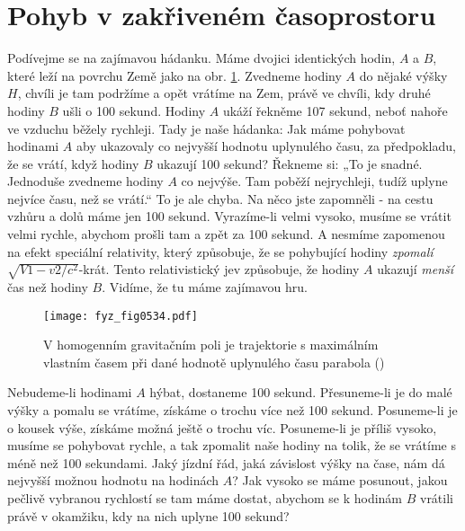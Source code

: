   \section{Pohyb v zakřiveném časoprostoru}\label{fyz:IIchapXVLIIsecVIII}
    Podívejme se na zajímavou hádanku. Máme dvojici identických hodin, \(A\) a \(B\), které leží na 
    povrchu Země jako na obr. \ref{fyz:fig0534}. Zvedneme hodiny \(A\) do nějaké výšky \(H\), chvíli 
    je tam podržíme a opět vrátíme na Zem, právě ve chvíli, kdy druhé hodiny \(B\) ušli o \num{100} 
    sekund. Hodiny \(A\) ukáží řekněme \num{107} sekund, neboť nahoře ve vzduchu běžely rychleji. 
    Tady je naše hádanka: Jak máme pohybovat hodinami \(A\) aby ukazovaly co nejvyšší hodnotu 
    uplynulého času, za předpokladu, že se vrátí, když hodiny \(B\) ukazují \num{100} sekund? 
    Řekneme si: „To je snadné. Jednoduše zvedneme hodiny \(A\) co nejvýše. Tam poběží nejrychleji, 
    tudíž uplyne nejvíce času, než se vrátí.“ To je ale chyba. Na něco jste zapomněli - na cestu 
    vzhůru a dolů máme jen \num{100} sekund. Vyrazíme-li velmi vysoko, musíme se vrátit velmi 
    rychle, abychom prošli tam a zpět za \num{100} sekund. A nesmíme zapomenou na efekt speciální 
    relativity, který způsobuje, že se pohybující hodiny \emph{zpomalí} \(\sqrt{V1 - 
    v2/c^2}\)-krát. Tento relativistický jev způsobuje, že hodiny \(A\) ukazují \emph{menší} čas 
    než hodiny \(B\). Vidíme, že tu máme zajímavou hru.
    
    \begin{figure}[ht!] %
      \centering
      \texttt{[image: fyz\_fig0534.pdf]}
      \caption{V homogenním gravitačním poli je trajektorie s maximálním vlastním časem při dané 
               hodnotě uplynulého času parabola
               (\cite[s.~791]{Feynman02})}
      \label{fyz:fig0534}
    \end{figure}
    
    Nebudeme-li hodinami \(A\) hýbat, dostaneme \num{100} sekund. Přesuneme-li je do malé výšky a 
    pomalu se vrátíme, získáme o trochu více než \num{100} sekund. Posuneme-li je o kousek výše, 
    získáme možná ještě o trochu víc. Posuneme-li je příliš vysoko, musíme se pohybovat rychle, a 
    tak zpomalit naše hodiny na tolik, že se vrátíme s méně než \num{100} sekundami. Jaký jízdní 
    řád, jaká závislost výšky na čase, nám dá nejvyšší možnou hodnotu na hodinách \(A\)? Jak vysoko 
    se máme posunout, jakou pečlivě vybranou rychlostí se tam máme dostat, abychom se k hodinám 
    \(B\) vrátili právě v okamžiku, kdy na nich uplyne \num{100} sekund?
    
